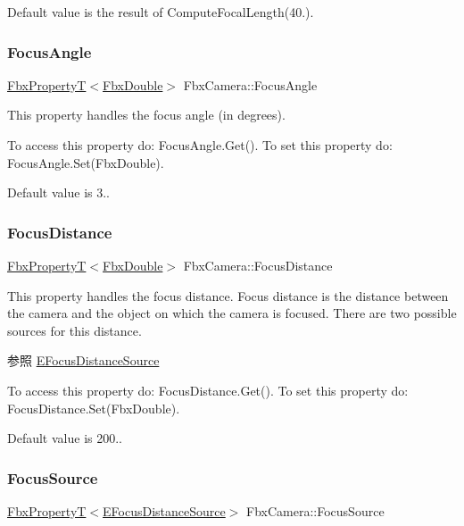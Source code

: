 Default value is the result of Compute\+Focal\+Length(40.). \mbox{\label{class_fbx_camera_af6d282d878bc8ad143c8095e29a4e94a}} 
\subsubsection{\texorpdfstring{Focus\+Angle}{FocusAngle}}
{\footnotesize\ttfamily \hyperlink{class_fbx_property_t}{Fbx\+PropertyT}$<$\hyperlink{fbxtypes_8h_a171e72a1c46fc15c1a6c9c31948c1c5b}{Fbx\+Double}$>$ Fbx\+Camera\+::\+Focus\+Angle}

This property handles the focus angle (in degrees).

To access this property do\+: Focus\+Angle.\+Get(). To set this property do\+: Focus\+Angle.\+Set(\+Fbx\+Double).

Default value is 3.. \mbox{\label{class_fbx_camera_af6165df26c7d25156163a3ed2a2f99c2}} 
\subsubsection{\texorpdfstring{Focus\+Distance}{FocusDistance}}
{\footnotesize\ttfamily \hyperlink{class_fbx_property_t}{Fbx\+PropertyT}$<$\hyperlink{fbxtypes_8h_a171e72a1c46fc15c1a6c9c31948c1c5b}{Fbx\+Double}$>$ Fbx\+Camera\+::\+Focus\+Distance}

This property handles the focus distance. Focus distance is the distance between the camera and the object on which the camera is focused. There are two possible sources for this distance. \begin{DoxySeeAlso}{参照}
\hyperlink{class_fbx_camera_a1b50e7b2953019a40328599679071ad4}{E\+Focus\+Distance\+Source}
\end{DoxySeeAlso}
To access this property do\+: Focus\+Distance.\+Get(). To set this property do\+: Focus\+Distance.\+Set(\+Fbx\+Double).

Default value is 200.. \mbox{\label{class_fbx_camera_a17f0c0c82ed8df4540d918567edcbd4a}} 
\subsubsection{\texorpdfstring{Focus\+Source}{FocusSource}}
{\footnotesize\ttfamily \hyperlink{class_fbx_property_t}{Fbx\+PropertyT}$<$\hyperlink{class_fbx_camera_a1b50e7b2953019a40328599679071ad4}{E\+Focus\+Distance\+Source}$>$ Fbx\+Camera\+::\+Focus\+Source}

